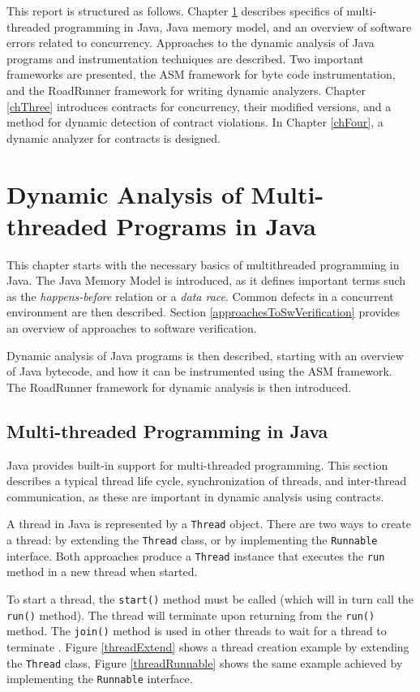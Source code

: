 This report is structured as follows. Chapter \ref{chTwo} describes specifics of
multi-threaded programming in Java, Java memory model, and an overview of
software errors related to concurrency. Approaches to the dynamic analysis of
Java programs and instrumentation techniques are described. Two important
frameworks are presented, the ASM framework for byte code instrumentation, and
the RoadRunner framework for writing dynamic analyzers. Chapter \ref{chThree}
introduces contracts for concurrency, their modified versions, and a method for
dynamic detection of contract violations. In Chapter \ref{chFour}, a dynamic
analyzer for contracts is designed.



\chapter{Dynamic Analysis of Multi-threaded Programs in Java}
\label{chTwo}

This chapter starts with the necessary basics of multithreaded programming in
Java.  The Java Memory Model is introduced, as it defines important terms such
as the \emph{happens-before} relation or a \emph{data race}. Common defects in
a concurrent environment are then described. Section
\ref{approachesToSwVerification} provides an overview of approaches to software
verification.

Dynamic analysis of Java programs is then described, starting with an overview
of Java bytecode, and how it can be instrumented using the ASM framework. The
RoadRunner framework for dynamic analysis is then introduced.


\section{Multi-threaded Programming in Java}

Java provides built-in support for multi-threaded programming. This section
describes a typical thread life cycle, synchronization of threads, and
inter-thread communication, as these are important in dynamic analysis using
contracts.

A thread in Java is represented by a \texttt{Thread} object. There are two ways
to create a thread: by extending the \texttt{Thread} class, or by implementing
the \texttt{Runnable} interface. Both approaches produce a \texttt{Thread}
instance that executes the \texttt{run} method in a new thread when started.

To start a thread, the \texttt{start()} method must be called (which will in
turn call the \texttt{run()} method). The thread will terminate upon returning
from the \texttt{run()} method. The \texttt{join()} method is used in other
threads to wait for a thread to terminate \cite{javaTheCompleteReference}.
Figure \ref{threadExtend} shows a thread creation example by extending the
\texttt{Thread} class, Figure \ref{threadRunnable} shows the same example
achieved by implementing the \texttt{Runnable} interface.

